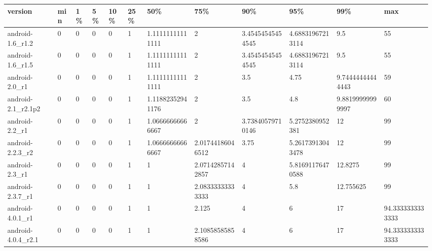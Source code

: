 \documentclass[a4paper]{article}
\begin{document}
\begin{tabular}{|l|l|l|l|l|l|l|l|l|l|l|l|}
\hline
version&min&1\%&5\%&10\%&25\%&50\%&75\%&90\%&95\%&99\%&max\\
\hline
android-1.6\_r1.2&0&0&0&0&1&1.11111111111111&2&3.45454545454545&4.68831967213114&9.5&55\\
\hline
android-1.6\_r1.5&0&0&0&0&1&1.11111111111111&2&3.45454545454545&4.68831967213114&9.5&55\\
\hline
android-2.0\_r1&0&0&0&0&1&1.11111111111111&2&3.5&4.75&9.74444444444443&59\\
\hline
android-2.1\_r2.1p2&0&0&0&0&1&1.11882352941176&2&3.5&4.8&9.88199999999997&60\\
\hline
android-2.2\_r1&0&0&0&0&1&1.06666666666667&2&3.73840579710146&5.2752380952381&12&99\\
\hline
android-2.2.3\_r2&0&0&0&0&1&1.06666666666667&2.01744186046512&3.75&5.26173913043478&12&99\\
\hline
android-2.3\_r1&0&0&0&0&1&1&2.07142857142857&4&5.81691176470588&12.8275&99\\
\hline
android-2.3.7\_r1&0&0&0&0&1&1&2.08333333333333&4&5.8&12.755625&99\\
\hline
android-4.0.1\_r1&0&0&0&0&1&1&2.125&4&6&17&94.3333333333333\\
\hline
android-4.0.4\_r2.1&0&0&0&0&1&1&2.10858585858586&4&6&17&94.3333333333333\\
\hline
\end{tabular}
\end{document}
